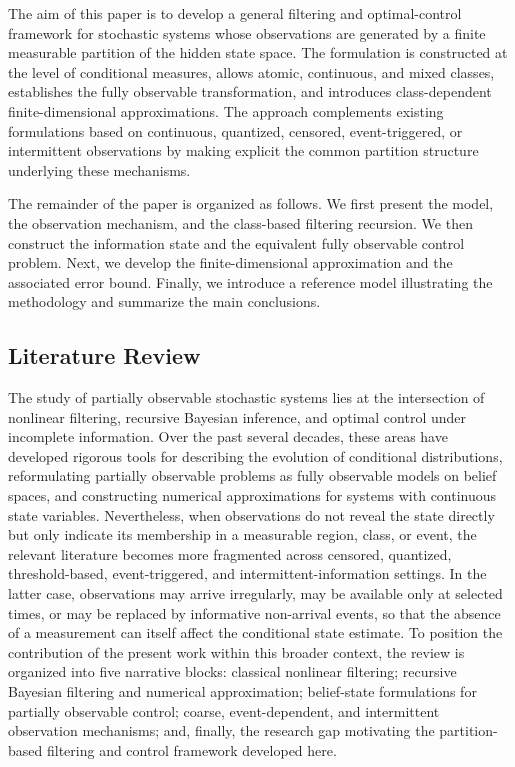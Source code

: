 \documentclass[10pt,twocolumn]{article}
\theoremstyle{remark}
\begin{document}
The aim of this paper is to develop a general filtering and optimal-control framework for stochastic systems whose observations are generated by a finite measurable partition of the hidden state space. The formulation is constructed at the level of conditional measures, allows atomic, continuous, and mixed classes, establishes the fully observable transformation, and introduces class-dependent finite-dimensional approximations. The approach complements existing formulations based on continuous, quantized, censored, event-triggered, or intermittent observations by making explicit the common partition structure underlying these mechanisms.

The remainder of the paper is organized as follows. We first present the model, the observation mechanism, and the class-based filtering recursion. We then construct the information state and the equivalent fully observable control problem. Next, we develop the finite-dimensional approximation and the associated error bound. Finally, we introduce a reference model illustrating the methodology and summarize the main conclusions.

\subsection{Literature Review}

The study of partially observable stochastic systems lies at the intersection of nonlinear filtering, recursive Bayesian inference, and optimal control under incomplete information. Over the past several decades, these areas have developed rigorous tools for describing the evolution of conditional distributions, reformulating partially observable problems as fully observable models on belief spaces, and constructing numerical approximations for systems with continuous state variables. Nevertheless, when observations do not reveal the state directly but only indicate its membership in a measurable region, class, or event, the relevant literature becomes more fragmented across censored, quantized, threshold-based, event-triggered, and intermittent-information settings. In the latter case, observations may arrive irregularly, may be available only at selected times, or may be replaced by informative non-arrival events, so that the absence of a measurement can itself affect the conditional state estimate. To position the contribution of the present work within this broader context, the review is organized into five narrative blocks: classical nonlinear filtering; recursive Bayesian filtering and numerical approximation; belief-state formulations for partially observable control; coarse, event-dependent, and intermittent observation mechanisms; and, finally, the research gap motivating the partition-based filtering and control framework developed here.
\end{document}
